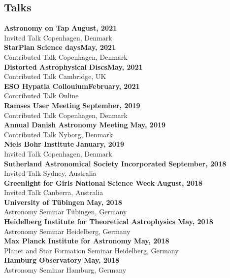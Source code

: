 \documentclass[margin,line]{res}
\begin{document}
\begin{resume}
		\section{\sc Talks}
		{\bf Astronomy on Tap} \hfill {\bf August, 2021}\\
		Invited Talk \hfill Copenhagen, Denmark\\
		{\bf StarPlan Science days}\hfill {\bf May, 2021}\\
		Contributed Talk \hfill Copenhagen, Denmark\\
		{\bf Distorted Astrophysical Discs}\hfill {\bf May, 2021}\\
		Contributed Talk \hfill Cambridge, UK\\
		{\bf ESO Hypatia Collouium}\hfill {\bf February, 2021}\\
		Contributed Talk \hfill Online\\
		{\bf Ramses User Meeting} \hfill {\bf September, 2019}\\
		Contributed Talk \hfill Copenhagen, Denmark\\
		{\bf Annual Danish Astronomy Meeting} \hfill {\bf May, 2019}\\
		Contributed Talk \hfill Nyborg, Denmark\\
		{\bf Niels Bohr Institute} \hfill {\bf January, 2019}\\
		Invited Talk \hfill Copenhagen, Denmark\\
		{\bf Sutherland Astronomical Society Incorporated} \hfill {\bf September, 2018}\\
		Invited Talk \hfill Sydney, Australia\\
		{\bf Greenlight for Girls National Science Week} \hfill {\bf August, 2018}\\
		Invited Talk \hfill Canberra, Australia\\
		{\bf University of T\"ubingen} \hfill {\bf May, 2018}\\
		Astronomy Seminar \hfill T\"ubingen, Germany\\
		{\bf Heidelberg Institute for Theoretical Astrophysics} \hfill {\bf May, 2018}\\
		Astronomy Seminar \hfill Heidelberg, Germany\\
		{\bf Max Planck Institute for Astronomy} \hfill {\bf May, 2018}\\
		Planet and Star Formation Seminar \hfill Heidelberg, Germany\\
		{\bf Hamburg Observatory} \hfill {\bf May, 2018}\\
		Astronomy Seminar \hfill Hamburg, Germany\\

\end{resume}
\end{document}
